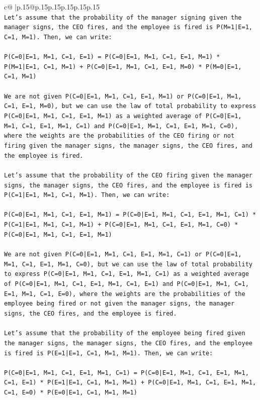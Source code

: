 \documentclass{article}
\begin{document}
{\begin{supertabular}{c@{$\;$}|p{.15\linewidth}@{}p{.15\linewidth}p{.15\linewidth}p{.15\linewidth}p{.15\linewidth}p{.15\linewidth}}
{{{\\ 
\texttt{Let's assume that the probability of the manager signing given the manager signs, the CEO fires, and the employee is fired is P(M=1|E=1, C=1, M=1). Then, we can write:} \\
\\ 
\texttt{P(C=0|E=1, M=1, C=1, E=1) = P(C=0|E=1, M=1, C=1, E=1, M=1) * P(M=1|E=1, C=1, M=1) + P(C=0|E=1, M=1, C=1, E=1, M=0) * P(M=0|E=1, C=1, M=1)} \\
\\ 
\texttt{We are not given P(C=0|E=1, M=1, C=1, E=1, M=1) or P(C=0|E=1, M=1, C=1, E=1, M=0), but we can use the law of total probability to express P(C=0|E=1, M=1, C=1, E=1, M=1) as a weighted average of P(C=0|E=1, M=1, C=1, E=1, M=1, C=1) and P(C=0|E=1, M=1, C=1, E=1, M=1, C=0), where the weights are the probabilities of the CEO firing or not firing given the manager signs, the manager signs, the CEO fires, and the employee is fired.} \\
\\ 
\texttt{Let's assume that the probability of the CEO firing given the manager signs, the manager signs, the CEO fires, and the employee is fired is P(C=1|E=1, M=1, C=1, M=1). Then, we can write:} \\
\\ 
\texttt{P(C=0|E=1, M=1, C=1, E=1, M=1) = P(C=0|E=1, M=1, C=1, E=1, M=1, C=1) * P(C=1|E=1, M=1, C=1, M=1) + P(C=0|E=1, M=1, C=1, E=1, M=1, C=0) * P(C=0|E=1, M=1, C=1, E=1, M=1)} \\
\\ 
\texttt{We are not given P(C=0|E=1, M=1, C=1, E=1, M=1, C=1) or P(C=0|E=1, M=1, C=1, E=1, M=1, C=0), but we can use the law of total probability to express P(C=0|E=1, M=1, C=1, E=1, M=1, C=1) as a weighted average of P(C=0|E=1, M=1, C=1, E=1, M=1, C=1, E=1) and P(C=0|E=1, M=1, C=1, E=1, M=1, C=1, E=0), where the weights are the probabilities of the employee being fired or not given the manager signs, the manager signs, the CEO fires, and the employee is fired.} \\
\\ 
\texttt{Let's assume that the probability of the employee being fired given the manager signs, the manager signs, the CEO fires, and the employee is fired is P(E=1|E=1, C=1, M=1, M=1). Then, we can write:} \\
\\ 
\texttt{P(C=0|E=1, M=1, C=1, E=1, M=1, C=1) = P(C=0|E=1, M=1, C=1, E=1, M=1, C=1, E=1) * P(E=1|E=1, C=1, M=1, M=1) + P(C=0|E=1, M=1, C=1, E=1, M=1, C=1, E=0) * P(E=0|E=1, C=1, M=1, M=1)} \\
}}}
\end{supertabular}}
\end{document}
